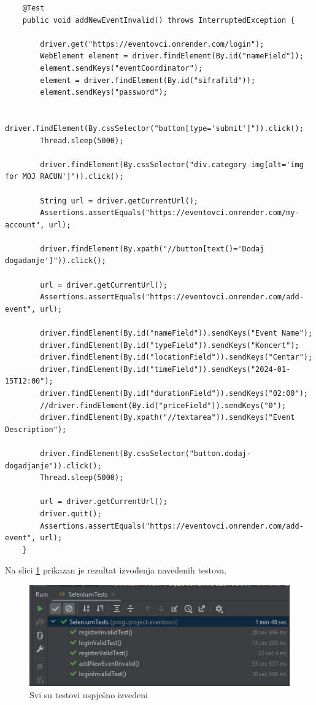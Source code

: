 \begin{lstlisting}
	@Test
	public void addNewEventInvalid() throws InterruptedException {
		
		driver.get("https://eventovci.onrender.com/login");
		WebElement element = driver.findElement(By.id("nameField"));
		element.sendKeys("eventCoordinator");
		element = driver.findElement(By.id("sifrafild"));
		element.sendKeys("password");
		
		driver.findElement(By.cssSelector("button[type='submit']")).click();
		Thread.sleep(5000);
		
		driver.findElement(By.cssSelector("div.category img[alt='img for MOJ RACUN']")).click();
		
		String url = driver.getCurrentUrl();
		Assertions.assertEquals("https://eventovci.onrender.com/my-account", url);
		
		driver.findElement(By.xpath("//button[text()='Dodaj dogadanje']")).click();
		
		url = driver.getCurrentUrl();
		Assertions.assertEquals("https://eventovci.onrender.com/add-event", url);
		
		driver.findElement(By.id("nameField")).sendKeys("Event Name");
		driver.findElement(By.id("typeField")).sendKeys("Koncert");
		driver.findElement(By.id("locationField")).sendKeys("Centar");
		driver.findElement(By.id("timeField")).sendKeys("2024-01-15T12:00");
		driver.findElement(By.id("durationField")).sendKeys("02:00");
		//driver.findElement(By.id("priceField")).sendKeys("0");
		driver.findElement(By.xpath("//textarea")).sendKeys("Event Description");
				
		driver.findElement(By.cssSelector("button.dodaj-dogadjanje")).click();
		Thread.sleep(5000);
		
		url = driver.getCurrentUrl();
		driver.quit();
		Assertions.assertEquals("https://eventovci.onrender.com/add-event", url);
	}
\end{lstlisting}

			Na slici \ref{sust} prikazan je rezultat izvođenja navedenih testova.

			\begin{figure}[H]
				\includegraphics[width=\textwidth]{slike/ispitivanje_sustava.jpeg} 
				\centering
				\vspace{-0.2cm}
				\caption{Svi su testovi uspješno izvedeni}
				\label{sust}
			\end{figure}
			
